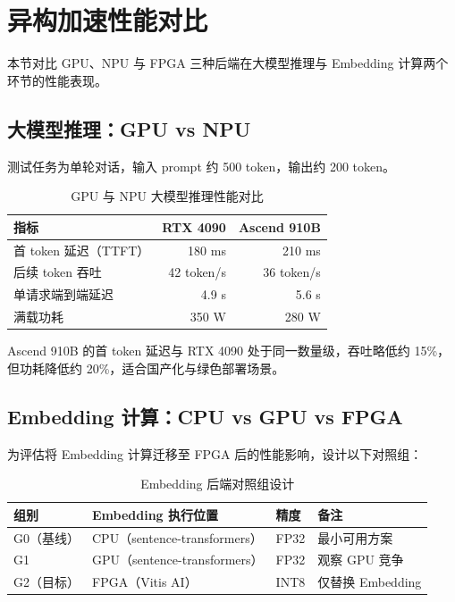 \section{异构加速性能对比}
本节对比 GPU、NPU 与 FPGA 三种后端在大模型推理与 Embedding 计算两个环节的性能表现。

\subsection{大模型推理：GPU vs NPU}
测试任务为单轮对话，输入 prompt 约 500 token，输出约 200 token。

\begin{table}[htbp]
  \centering
  \caption{GPU 与 NPU 大模型推理性能对比}
  \label{tab:gpu-npu}
  \begin{tabular}{lrr}
    \toprule
    指标 & RTX 4090 & Ascend 910B \\
    \midrule
    首 token 延迟（TTFT） & 180 ms & 210 ms \\
    后续 token 吞吐 & 42 token/s & 36 token/s \\
    单请求端到端延迟 & 4.9 s & 5.6 s \\
    满载功耗 & 350 W & 280 W \\
    \bottomrule
  \end{tabular}
\end{table}

Ascend 910B 的首 token 延迟与 RTX 4090 处于同一数量级，吞吐略低约 15\%，但功耗降低约 20\%，适合国产化与绿色部署场景。

\subsection{Embedding 计算：CPU vs GPU vs FPGA}
为评估将 Embedding 计算迁移至 FPGA 后的性能影响，设计以下对照组：

\begin{table}[htbp]
  \centering
  \caption{Embedding 后端对照组设计}
  \begin{tabular}{llll}
    \toprule
    组别 & Embedding 执行位置 & 精度 & 备注 \\
    \midrule
    G0（基线） & CPU（sentence-transformers） & FP32 & 最小可用方案 \\
    G1 & GPU（sentence-transformers） & FP32 & 观察 GPU 竞争 \\
    G2（目标） & FPGA（Vitis AI） & INT8 & 仅替换 Embedding \\
    \bottomrule
  \end{tabular}
\end{table}

